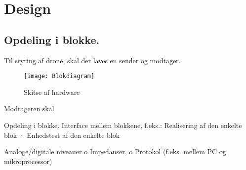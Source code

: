 \documentclass[Main]{subfiles}
\begin{document}
\chapter{Design}

\section{Opdeling i blokke.}

Til styring af drone, skal der laves en sender og modtager.

\begin{figure}[H]
\centering
\texttt{[image: Blokdiagram]}
\caption{Skitse af hardware}
\end{figure}

Modtageren skal 

Opdeling i blokke.
Interface mellem blokkene, f.eks.:
Realisering af den enkelte blok
· Enhedstest af den enkelte blok

Analoge/digitale niveauer
o Impedanser,
o Protokol (f.eks. mellem PC og mikroprocessor)
\end{document}
